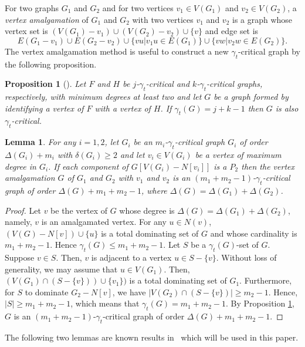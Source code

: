 \documentclass[12pt]{amsart}
\newtheorem{lem}[thm]{Lemma}
\newtheorem{prop}[thm]{Proposition}
\begin{document}
For two graphs $G_1$ and $G_2$  and for two vertices $v_1 \in V(G_1)$ and $v_2 \in V(G_2)$, a \emph{vertex amalgamation} of $G_1$ and $G_2$ with two vertices $v_1$ and $v_2$ is a graph whose vertex set is $(V(G_1)-v_1)\cup (V(G_2)-v_2) \cup \{ v \}$ and edge set is \
\[ E(G_1-v_1) \cup E(G_2 - v_2) \cup \{ vu | v_1u \in E(G_1) \} \cup  \{ vw | v_2w \in E(G_2) \}. \]
The vertex amalgamation method is useful to construct a new
$\gamma_t$-critical graph by the following proposition.

\begin{prop}  [\cite{GHHM}] \label{vertex-amal-prop}
Let $F$ and $H$ be $j$-$\gamma_t$-critical and $k$-$\gamma_t$-critical graphs, respectively, with minimum degrees at least two and let $G$ be a graph formed by identifying a vertex of $F$ with a vertex of $H$. If $\gamma_t (G)=j+k-1$ then $G$ is also $\gamma_t$-critical.
\end{prop}

\begin{lem} \label{vertex-amal}
For any $i=1,2$, let $G_i$ be an $m_i$-$\gamma_t$-critical graph
$G_i$ of order $\Delta (G_i)+m_i$ with $\delta(G_i) \ge 2$ and let
$v_i \in V(G_i)$ be a vertex of maximum degree in $G_i$. If each
component of $G[V(G_i)-N[v_i]]$ is a $P_2$ then  the vertex
amalgamation $G$ of $G_1$ and $G_2$ with $v_1$ and $v_2$ is an
$(m_1+m_2-1)$-$\gamma_t$-critical graph  of order $\Delta
(G)+m_1+m_2-1$, where $\Delta(G) = \Delta(G_1)+\Delta(G_2)$.
\end{lem}

\begin{proof}
Let $v$ be the vertex of $G$ whose degree is $\Delta(G) = \Delta(G_1)+\Delta(G_2)$, namely, $v$ is an amalgamated vertex.
 For any $u \in N(v)$, $(V(G)-N[v])\cup \{u \}$ is a total dominating set of $G$ and whose cardinality is $m_1+m_2-1$. Hence $\gamma_t(G) \le m_1 + m_2 -1$. Let $S$ be a $\gamma_t(G)$-set of $G$.
Suppose $v \in S$. Then, $v$ is adjacent to a vertex $u \in S-\{ v \}$. Without loss of generality, we may assume that $u \in V(G_1)$. Then, $(V(G_1)\cap (S-\{ v \}) )\cup \{v_1 \})$ is a total dominating set of $G_1$. Furthermore, for $S$ to dominate $G_2 -N[v]$, we have $|V(G_2)\cap  (S-\{ v \})| \ge m_2-1$. Hence, $|S| \ge m_1 + m_2 -1$, which means that  $\gamma_t(G)=m_1+m_2-1$. By Proposition \ref{vertex-amal-prop}, $G$ is an
$(m_1+m_2-1)$-$\gamma_t$-critical graph  of order $\Delta
(G)+m_1+m_2-1$.
\end{proof}

The following two lemmas are known results in~\cite{GHHM} which
will be used in this paper.
\end{document}
